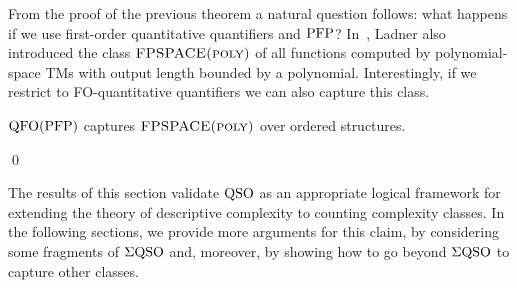 From the proof of the previous theorem a natural question follows: what happens if we use first-order quantitative quantifiers and ${\rm PFP}$?
In~\cite{Ladner89}, Ladner also introduced the class $\text{\sc FPSPACE(poly)}$ of all functions computed by polynomial-space TMs 
with output length bounded by a polynomial.
Interestingly, if we restrict to FO-quantitative quantifiers we can also capture this class.
\begin{cor} \label{cor:capture-fpspace-poly}
	${\rm QFO}({\rm PFP})$ captures $\text{\sc FPSPACE(poly)}$ over ordered structures.
\end{cor}
\proof

\qed

The results of this section validate ${\rm QSO}$ as an appropriate logical framework for extending the theory of descriptive complexity to counting complexity classes. In the following sections, we provide more arguments for this claim, by considering some fragments of $\Sigma{\rm QSO}$ and, moreover, by showing how to go beyond $\Sigma{\rm QSO}$ to capture other classes.